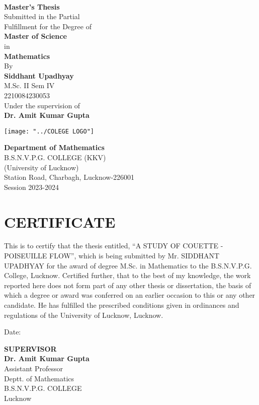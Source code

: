 \documentclass[14pt,one side, a4paper]{extbook}
\begin{document}
	\begin{titlepage}
		\\ \vspace{0.1cm}\Large{\textbf{Master's Thesis}}\\ 
		Submitted in the Partial\\ Fulfillment for the Degree of\\\vspace{0.1cm}\Large{\textbf{Master of Science}}\\ in\\ {\textbf{Mathematics}}\\{By}\\{\textbf{Siddhant Upadhyay}}\\{M.Sc. II Sem IV}\\{2210084230053}\\{Under the supervision of}\\{\textbf{Dr. Amit Kumar Gupta}}
		\begin{center}
			\texttt{[image: "../COLEGE LOGO"]}
		\end{center}
		
			{\textbf{Department of Mathematics}\\
				{B.S.N.V.P.G. COLLEGE (KKV)}}\\
			(University of Lucknow)\\
		{Station Road, Charbagh, Lucknow-226001}\\
		{Session  2023-2024}
	\end{titlepage}
	\setcounter{tocdepth}{2}
		\chapter*{\centering \Large CERTIFICATE}
		 \begin{Large}
		 This is to certify that the thesis entitled, “A STUDY OF COUETTE - POISEUILLE FLOW”, which is being submitted by Mr. SIDDHANT UPADHYAY for the award of degree M.Sc. in Mathematics to the B.S.N.V.P.G. College, Lucknow. Certified further, that to the best of my knowledge, the work reported here  does not form part of any other thesis or dissertation, the basis of which a degree or award was conferred on an earlier occasion to this or any other candidate. He has fulfilled the prescribed conditions given in ordinances and regulations of the University of Lucknow, Lucknow.
		\end{Large}
		\vspace{3.2cm}
		\begin{flushright}
			\begin{flushleft}
			Date:
		\end{flushleft}
		\textbf{SUPERVISOR}\\\textbf{Dr. Amit Kumar Gupta}\\Assistant Professor\\Deptt. of Mathematics\\B.S.N.V.P.G. COLLEGE\\Lucknow
				\end{flushright}
\end{document}
